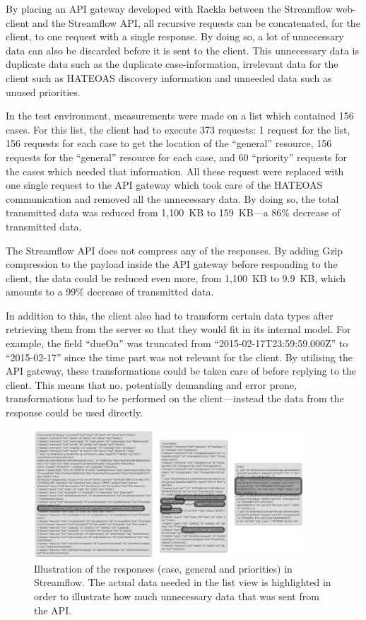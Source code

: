 \documentclass{cslthse-msc}
\begin{document}
By placing an API gateway developed with Rackla between the Streamflow web-client and the Streamflow API, all recursive requests can be concatenated, for the client, to one request with a single response. By doing so, a lot of unnecessary data can also be discarded before it is sent to the client. This unnecessary data is duplicate data such as the duplicate case-information, irrelevant data for the client such as HATEOAS discovery information and unneeded data such as unused priorities.

In the test environment, measurements were made on a list which contained 156 cases. For this list, the client had to execute 373 requests: 1 request for the list, 156 requests for each case to get the location of the \enquote{general} resource, 156 requests for the \enquote{general} resource for each case, and 60 \enquote{priority} requests for the cases which needed that information. All these request were replaced with one single request to the API gateway which took care of the HATEOAS communication and removed all the unnecessary data. By doing so, the total transmitted data was reduced from 1,100~KB to 159~KB---a 86\% decrease of transmitted data.

The Streamflow API does not compress any of the responses. By adding Gzip compression to the payload inside the API gateway before responding to the client, the data could be reduced even more, from 1,100~KB to 9.9~KB, which amounts to a 99\% decrease of transmitted data.

In addition to this, the client also had to transform certain data types after retrieving them from the server so that they would fit in its internal model. For example, the field \enquote{dueOn} was truncated from \enquote{2015-02-17T23:59:59.000Z} to \enquote{2015-02-17} since the time part was not relevant for the client. By utilising the API gateway, these transformations could be taken care of before replying to the client. This means that no, potentially demanding and error prone, transformations had to be performed on the client---instead the data from the response could be used directly.

\begin{figure}[H]
  \centering
    \begin{center}
      \includegraphics[width=0.9\textwidth]{images/streamflow_response.png}
    \end{center}
  \caption{Illustration of the responses (case, general and priorities) in Streamflow. The actual data needed in the list view is highlighted in order to illustrate how much unnecessary data that was sent from the API.}
\end{figure}
\end{document}
